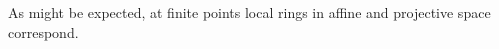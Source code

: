 \begin{example}

\end{example}

As might be expected, at finite points local rings in affine and projective space correspond.

